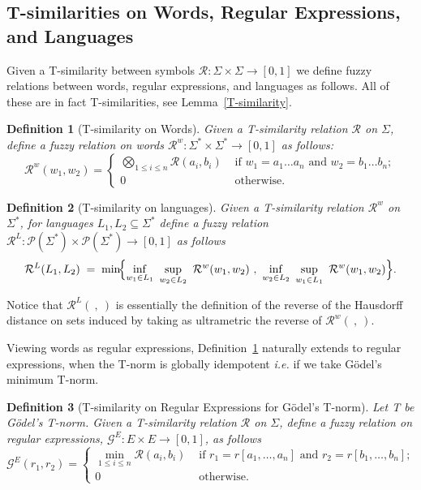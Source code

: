 \documentclass{article}
\def\ie{{\em i.e. }}
\newtheorem{definition}{Definition}[section]
\begin{document}
\subsection{T-similarities on Words, Regular Expressions, and Languages}
Given a T-similarity between symbols $\mathcal{R}:\Sigma \times \Sigma \rightarrow [0,1]$ we define fuzzy relations between words, regular expressions, and languages as follows. All of these are in fact T-similarities, see Lemma~\ref{T-similarity}.
\begin{definition}[T-similarity on Words]\label{def:Rw}Given a T-similarity relation $\mathcal R$ on $\Sigma$, define a fuzzy relation on words $\mathcal{R}^w:\Sigma^* \times \Sigma^* \rightarrow [0,1]$ as follows:$$\mathcal R^{w}(w_1,w_2) =\begin{cases}\bigotimes_{1\leq i\leq n}\mathcal R(a_i,b_i) &\mbox{ if } w_1=a_1\ldots a_n\mbox{ and }w_2 =b_1 \ldots b_n;
\\ 
0& \mbox{ otherwise. }
\end{cases}$$
\end{definition}
\begin{definition}[T-similarity on languages]\label{def:RL}
Given a T-similarity relation $\mathcal R^w$ on $\Sigma^*$, for languages $L_1,L_2\subseteq \Sigma^*$ define a fuzzy relation $\mathcal{R}^L:\mathcal P(\Sigma^*)\times \mathcal P(\Sigma^*)\to [0,1]$ as follows
\[
\mathcal{R}^L(L_1,L_2)\;=\;
\min\!\Bigl\{
\inf_{w_1\in L_1}\ \sup_{w_2\in L_2}\ \mathcal{R}^w(w_1,w_2)\ ,\
\inf_{w_2\in L_2}\ \sup_{w_1\in L_1}\ \mathcal{R}^w(w_1,w_2)
\Bigr\}.
\]
\end{definition}

Notice that $\mathcal R^L(\ ,\ )$ is essentially the definition of the reverse of the Hausdorff distance on sets induced by taking as ultrametric the reverse of $\mathcal R^w(\ ,\ )$.

Viewing words as regular expressions, Definition~\ref{def:Rw} naturally extends to regular expressions, when the T-norm is globally idempotent \ie if we take G\"odel's minimum T-norm.
\begin{definition}[T-similarity on Regular Expressions for G\"odel's T-norm] \label{def:Rexp}Let T be G\"odel's T-norm. Given a T-similarity relation $\mathcal R$ on $\Sigma$, define a fuzzy relation on regular expressions, $\mathcal{G}^{E}:E \times E \rightarrow [0,1]$, as follows
$$\mathcal G^{E}(r_1,r_2) =\begin{cases}\min_{1\leq i\leq n}\mathcal R(a_i,b_i) &\mbox{ if } r_1=r[a_1,\ldots,a_n]\mbox{ and }r_2 =r[b_1,\ldots,b_n];
\\ 
0& \mbox{ otherwise. }
\end{cases}$$
\end{definition}
\end{document}
